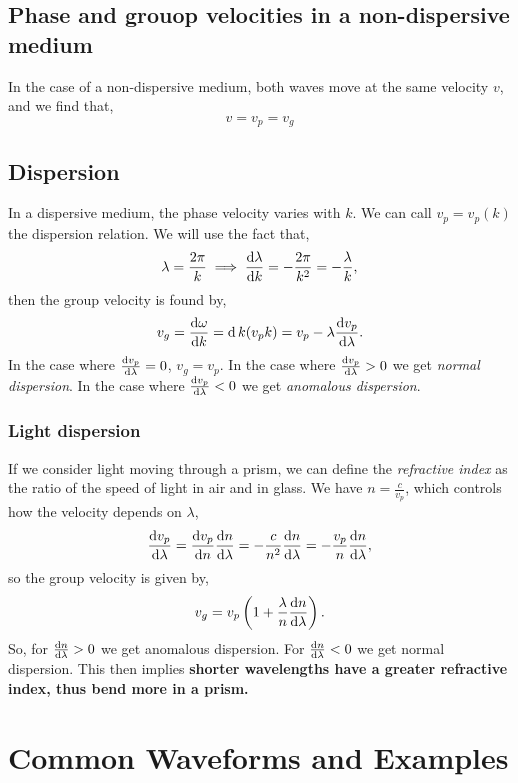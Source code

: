 \documentclass{book}
\begin{document}
\section{Phase and grouop velocities in a non-dispersive medium}
In the case of a non-dispersive medium, both waves move at the same velocity $v$, and we find that,
\begin{equation}
	v = v_p = v_g
\end{equation}
\section{Dispersion}
In a dispersive medium, the phase velocity varies with $k$. We can call $v_p = v_p(k)$ the dispersion relation. We will use the fact that,
\begin{equation}
	\lambda = \frac{2\pi}{k} \implies \dv{\lambda}{k} = -\frac{2\pi}{k^2} = -\frac{\lambda}{k},
\end{equation}
then the group velocity is found by,
\begin{equation}
	v_g = \dv{\omega}{k} = \dd{}{k}(v_pk) = v_p -\lambda\dv{v_p}{\lambda}.
\end{equation}
In the case where $\dv{v_p}{\lambda} = 0$, $v_g = v_p$. In the case where $\dv{v_p}{\lambda} > 0$ we get \textit{normal dispersion}. In the case where $\dv{v_p}{\lambda} < 0$ we get \textit{anomalous dispersion}.
\subsection{Light dispersion}
If we consider light moving through a prism, we can define the \textit{refractive index} as the ratio of the speed of light in air and in glass. We have $n = \frac{c}{v_p}$, which controls how the velocity depends on $\lambda$,
\begin{equation}
	\dv{v_p}{\lambda} = \dv{v_p}{n}\dv{n}{\lambda} = -\frac{c}{n^2}\dv{n}{\lambda} = -\frac{v_p}{n}\dv{n}{\lambda},
\end{equation} 
so the group velocity is given by,
\begin{equation}
	v_g = v_p \left(1 + \frac{\lambda}{n}\dv{n}{\lambda}\right).
\end{equation}
So, for $\dv{n}{\lambda} > 0$ we get anomalous dispersion. For $\dv{n}{\lambda} < 0$ we get normal dispersion. This then implies \textbf{shorter wavelengths have a greater refractive index, thus bend more in a prism.}
\appendix
\chapter{Common Waveforms and Examples}
\end{document}
